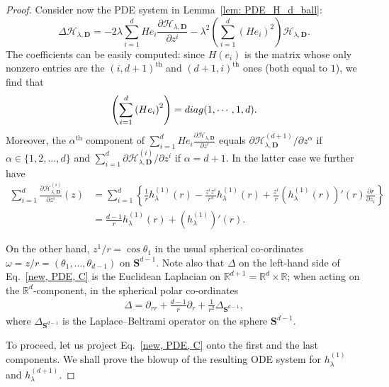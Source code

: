 \documentclass[10pt,a4paper]{amsart}
\newcommand{\R}{\mathbb{R}}
\newcommand{\p}{\partial}
\begin{document}
\begin{proof}
Consider now the PDE system in Lemma~\ref{lem: PDE_H_d_ball}:
\begin{equation}\label{new, PDE, C}
\Delta \mathcal{H}_{\lambda, \mathbf{D}}=-2\lambda\sum_{i=1}^{d}He_{i}\frac{\partial \mathcal{H}_{\lambda, \mathbf{D}}}{\partial z^{i}}-\lambda^{2}\left(\sum_{i=1}^{d}\left(He_{i}\right)^{2}\right)\mathcal{H}_{\lambda, \mathbf{D}}.
\end{equation}
The coefficients can be  easily computed: since $H(e_i)$ is the matrix whose only nonzero entries are the $(i, d+1)^{\text{th}}$ and $(d+1, i)^{\text{th}}$ ones (both equal to $1$), we find that
\begin{equation}\label{proj identity A}
    \left(\sum_{i=1}^{d}\left(He_{i}\right)^{2}\right) = {\rm diag}(1,\cdots,1,d).
\end{equation}
Moreover, the $\alpha^{\text{th}}$ component of  $\sum_{i=1}^{d}He_{i}\frac{\partial \mathcal{H}_{\lambda, \mathbf{D}}}{\partial z^{i}}$ equals $
      {\p \mathcal{H}_{\lambda, \mathbf{D}}^{(d+1)}}\slash{\p z^\alpha}$ if $\alpha\in \{1,2,\ldots,d\}$ and $
      \sum_{i=1}^d \p \mathcal{H}_{\lambda, \mathbf{D}}^{(i)}\slash \p z^i$ if  $\alpha=d+1$. In the latter case we further have
      \begin{align}\label{proj identity B}
    \sum_{i=1}^d \frac{\p \mathcal{H}_{\lambda, \mathbf{D}}^{(i)}}{\p z^i}(z) &=   \sum_{i=1}^d\left\{ \frac{1}{r}h_{\lambda}^{(1)}(r) - \frac{z^i z^i}{r^3}h_{\lambda}^{(1)}(r) + \frac{z^i}{r}\left(h_{\lambda}^{(1)}(r)\right)'(r) \frac{\p r}{\p z_i} \right\}\nonumber \\
   &= \frac{d-1}{r}h_{\lambda}^{(1)}(r)+ \left(h_{\lambda}^{(1)}\right)'(r). 
      \end{align}

On the other hand, $z^1/r=\cos\theta_1$ in the usual spherical co-ordinates $\omega=z/r=(\theta_1, \ldots, \theta_{d-1})$ on $\mathbf{S}^{d-1}$. Note also that $\Delta$ on the left-hand side of Eq.~\eqref{new, PDE, C} is the Euclidean Laplacian on $\R^{d+1}=\R^d\times \R$; when acting on the $\R^d$-component, in the spherical polar co-ordinates 
\begin{align}\label{identity, beltrami}
    \Delta = \p_{rr} + \frac{d-1}{r} \p_r  + \frac{1}{r^2}\Delta_{\mathbf{S}^{d-1}},  
\end{align}
where $\Delta_{\mathbf{S}^{d-1}}$ is the Laplace--Beltrami operator on the sphere $\mathbf{S}^{d-1}$.


To proceed, let us project Eq.~\eqref{new, PDE, C} onto the first and the last components. We shall prove the blowup of the resulting ODE system for $h_\lambda^{(1)}$ and $h_\lambda^{(d+1)}$.




\end{proof}
\end{document}
